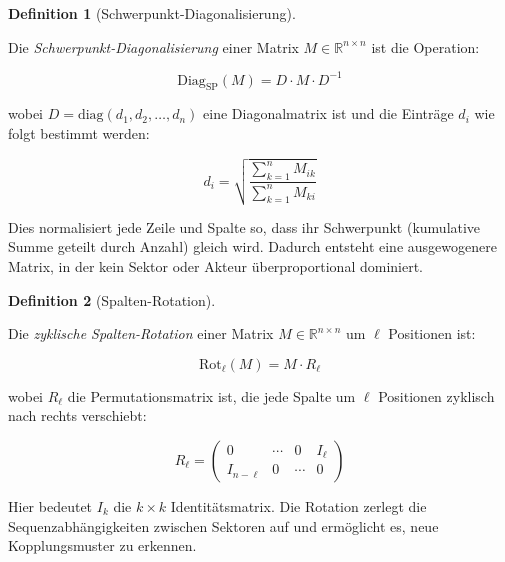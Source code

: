 \documentclass[a4paper,12pt]{article}
\theoremstyle{definition}
\newtheorem{definition}{Definition}
\begin{document}
\begin{definition}[Schwerpunkt-Diagonalisierung]
\label{def:schwerpunkt}

Die \emph{Schwerpunkt-Diagonalisierung} einer Matrix $M \in \mathbb{R}^{n \times n}$ ist die Operation:

\begin{equation}
\text{Diag}_{\text{SP}}(M) = D \cdot M \cdot D^{-1}
\end{equation}

wobei $D = \text{diag}(d_1, d_2, \ldots, d_n)$ eine Diagonalmatrix ist und die Einträge $d_i$ wie folgt bestimmt werden:

\begin{equation}
d_i = \sqrt{\frac{\sum_{k=1}^{n} M_{ik}}{\sum_{k=1}^{n} M_{ki}}}
\end{equation}

Dies normalisiert jede Zeile und Spalte so, dass ihr Schwerpunkt (kumulative Summe geteilt durch Anzahl) gleich wird. Dadurch entsteht eine ausgewogenere Matrix, in der kein Sektor oder Akteur überproportional dominiert.

\end{definition}

\begin{definition}[Spalten-Rotation]
\label{def:rotation}

Die \emph{zyklische Spalten-Rotation} einer Matrix $M \in \mathbb{R}^{n \times n}$ um $\ell$ Positionen ist:

\begin{equation}
\text{Rot}_{\ell}(M) = M \cdot R_{\ell}
\end{equation}

wobei $R_{\ell}$ die Permutationsmatrix ist, die jede Spalte um $\ell$ Positionen zyklisch nach rechts verschiebt:

\begin{equation}
R_{\ell} = \begin{pmatrix}
0 & \cdots & 0 & I_{\ell} \\
I_{n-\ell} & 0 & \cdots & 0
\end{pmatrix}
\end{equation}

Hier bedeutet $I_k$ die $k \times k$ Identitätsmatrix. Die Rotation zerlegt die Sequenzabhängigkeiten zwischen Sektoren auf und ermöglicht es, neue Kopplungsmuster zu erkennen.

\end{definition}
\end{document}
